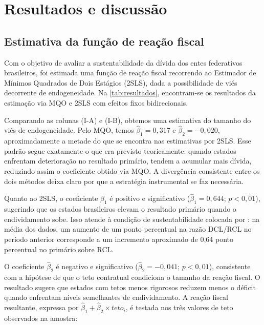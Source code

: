 \chapter{Resultados e discussão}
\label{chap:resultados}

\section{Estimativa da função de reação fiscal}

Com o objetivo de avaliar a sustentabilidade da dívida dos entes federativos brasileiros, foi estimada uma função de reação fiscal recorrendo ao Estimador de Mínimos Quadrados de Dois Estágios (2SLS), dada a possibilidade de viés decorrente de endogeneidade. Na \autoref{tab:resultados}, encontram-se os resultados da estimação via MQO e 2SLS com efeitos fixos bidirecionais.



Comparando as colunas (I-A) e (I-B), obtemos uma estimativa do tamanho do viés de endogeneidade. Pelo MQO, temos $\hat{\beta}_1 = 0{,}317$ e $\hat{\beta}_2 = -0{,}020$, aproximadamente a metade do que se encontra nas estimativas por 2SLS. Esse padrão segue exatamente o que era previsto teoricamente: quando estados enfrentam deterioração no resultado primário, tendem a acumular mais dívida, reduzindo assim o coeficiente obtido via MQO. A divergência consistente entre os dois métodos deixa claro por que a estratégia instrumental se faz necessária.

Quanto ao 2SLS, o coeficiente $\hat{\beta}_1$ é positivo e significativo ($\hat{\beta}_1 = 0{,}644$; $p < 0{,}01$), sugerindo que os estados brasileiros elevam o resultado primário quando o endividamento sobe. Isso atende à condição de sustentabilidade colocada por : na média dos dados, um aumento de um ponto percentual na razão DCL/RCL no período anterior corresponde a um incremento aproximado de 0,64 ponto percentual no primário sobre RCL.

O coeficiente $\hat{\beta}_2$ é negativo e significativo ($\hat{\beta}_2 = -0{,}041$; $p < 0{,}01$), consistente com a hipótese de que o teto contratual condiciona o tamanho da reação fiscal. O resultado sugere que estados com tetos menos rigorosos reduzem menos o déficit quando enfrentam níveis semelhantes de endividamento. A reação fiscal resultante, expressa por $\hat{\beta}_1 + \hat{\beta}_2 \times teto_i$, é testada nos três valores de teto observados na amostra:

